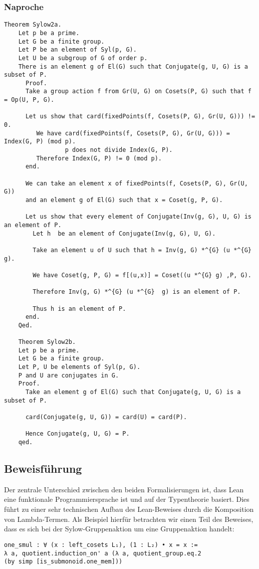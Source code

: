 \documentclass[a4paper,12pt]{scrartcl}
\begin{document}
\subsubsection{Naproche}


\begin{lstlisting}
Theorem Sylow2a.
	Let p be a prime.
	Let G be a finite group.
	Let P be an element of Syl(p, G).
	Let U be a subgroup of G of order p.
	There is an element g of El(G) such that Conjugate(g, U, G) is a subset of P.
	  Proof.
	  Take a group action f from Gr(U, G) on Cosets(P, G) such that f = Op(U, P, G).
	  
	  Let us show that card(fixedPoints(f, Cosets(P, G), Gr(U, G))) !=  0.
		 We have card(fixedPoints(f, Cosets(P, G), Gr(U, G))) = Index(G, P) (mod p).
				 p does not divide Index(G, P).
		 Therefore Index(G, P) != 0 (mod p).
	  end.
	  
	  We can take an element x of fixedPoints(f, Cosets(P, G), Gr(U, G))
	  and an element g of El(G) such that x = Coset(g, P, G).
	  
	  Let us show that every element of Conjugate(Inv(g, G), U, G) is an element of P.
		Let h  be an element of Conjugate(Inv(g, G), U, G).
	
		Take an element u of U such that h = Inv(g, G) *^{G} (u *^{G}  g).
	
		We have Coset(g, P, G) = f[(u,x)] = Coset((u *^{G} g) ,P, G).
	
		Therefore Inv(g, G) *^{G} (u *^{G}  g) is an element of P.
	
		Thus h is an element of P.
	  end.
	Qed.

	Theorem Sylow2b.
	Let p be a prime.
	Let G be a finite group.
	Let P, U be elements of Syl(p, G).
	P and U are conjugates in G.
	Proof.
	  Take an element g of El(G) such that Conjugate(g, U, G) is a subset of P.
	
	  card(Conjugate(g, U, G)) = card(U) = card(P).
	
	  Hence Conjugate(g, U, G) = P.
	qed.
\end{lstlisting}


\subsection{Beweisführung}

Der zentrale Unterschied zwischen den beiden Formalisierungen ist, dass Lean eine funktionale Programmiersprache ist und auf der Typentheorie basiert. Dies führt zu einer sehr technischen Aufbau des Lean-Beweises durch die Komposition von Lambda-Termen.
Als Beispiel hierfür betrachten wir einen Teil des Beweises, dass es sich bei der Sylow-Gruppenaktion um eine Gruppenaktion handelt:
\lstset{language=lean}
\begin{lstlisting}
one_smul : ∀ (x : left_cosets L₁), (1 : L₂) • x = x := 
λ a, quotient.induction_on' a (λ a, quotient_group.eq.2 
(by simp [is_submonoid.one_mem]))
\end{lstlisting}
\end{document}
